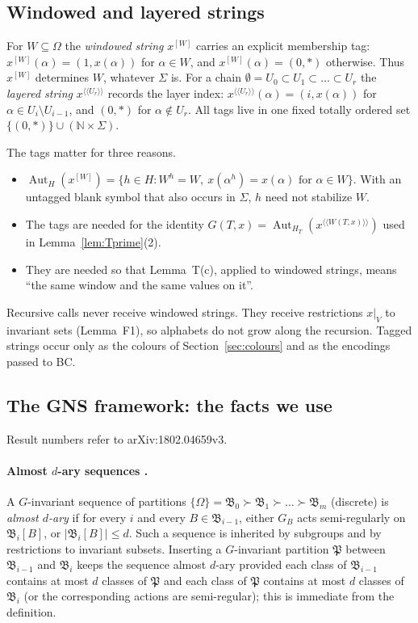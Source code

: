 \documentclass[11pt]{article}
\theoremstyle{plain}
\theoremstyle{definition}
\theoremstyle{remark}
\theoremstyle{named}
\theoremstyle{namedrm}
\newcommand{\Aut}{\operatorname{Aut}}
\newcommand{\fB}{\mathfrak{B}}
\newcommand{\fP}{\mathfrak{P}}
\newcommand{\win}[2]{#1^{[#2]}}
\newcommand{\lay}[2]{#1^{\langle\!\langle #2\rangle\!\rangle}}
\begin{document}
\subsection{Windowed and layered strings}\label{sec:tags}

For $W\subseteq\Omega$ the \emph{windowed string} $\win{x}{W}$ carries an explicit membership tag:
$\win{x}{W}(\alpha)=(1,x(\alpha))$ for $\alpha\in W$, and $\win{x}{W}(\alpha)=(0,*)$ otherwise. Thus
$\win{x}{W}$ determines $W$, whatever $\Sigma$ is. For a chain $\emptyset=U_0\subset U_1\subset\dots\subset U_r$
the \emph{layered string} $\lay{x}{U_r}$ records the layer index: $\lay{x}{U_r}(\alpha)=(i,x(\alpha))$ for
$\alpha\in U_i\setminus U_{i-1}$, and $(0,*)$ for $\alpha\notin U_r$. All tags live in one fixed totally
ordered set $\{(0,*)\}\cup(\mathbb N\times\Sigma)$.

The tags matter for three reasons.
\begin{itemize}
\item $\Aut_H(\win{x}{W})=\{h\in H:W^h=W,\ x(\alpha^h)=x(\alpha)\text{ for }\alpha\in W\}$. With an untagged blank
  symbol that also occurs in $\Sigma$, $h$ need not stabilize $W$.
\item The tags are needed for the identity $G(T,x)=\Aut_{H_T}(\lay{x}{W(T,x)})$ used in
  Lemma~\ref{lem:Tprime}(2).
\item They are needed so that Lemma~T(c), applied to windowed strings, means ``the same
  window and the same values on it''.
\end{itemize}
Recursive calls never receive windowed strings. They receive restrictions $x|_V$ to invariant sets
(Lemma~F1), so alphabets do not grow along the recursion. Tagged strings occur only as the
colours of Section~\ref{sec:colours} and as the encodings passed to BC.

\subsection{The GNS framework: the facts we use}\label{sec:gnsrecap}

Result numbers refer to arXiv:1802.04659v3.

\paragraph{Almost $d$-ary sequences \cite[Def.~4.1, Obs.~4.2]{GNS}.} A $G$-invariant sequence of
partitions $\{\Omega\}=\fB_0\succ\fB_1\succ\dots\succ\fB_m$ (discrete) is \emph{almost $d$-ary} if for every
$i$ and every $B\in\fB_{i-1}$, either $G_B$ acts semi-regularly on $\fB_i[B]$, or $|\fB_i[B]|\le d$. Such a
sequence is inherited by subgroups and by restrictions to invariant subsets. Inserting a $G$-invariant
partition $\fP$ between $\fB_{i-1}$ and $\fB_i$ keeps the sequence almost $d$-ary provided each class of
$\fB_{i-1}$ contains at most $d$ classes of $\fP$ and each class of $\fP$ contains at most $d$ classes of
$\fB_i$ (or the corresponding actions are semi-regular); this is immediate from the definition.
\end{document}
